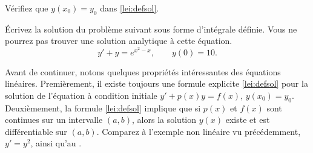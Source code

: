 \begin{exercise}
	Vérifiez que $y(x_0) = y_0$ dans \eqref{lei:defsol}.
\end{exercise}

\begin{exercise}
	Écrivez la solution du problème suivant sous forme d'intégrale définie.  Vous ne pourrez pas trouver une solution analytique à cette équation.
	\begin{equation*}
		y' + y = e^{x^2-x}, \qquad y(0) = 10 .
	\end{equation*}
\end{exercise}

\begin{remark}\label{rem:regular}
	Avant de continuer, notons quelques propriétés intéressantes des équations linéaires.  Premièrement, il existe toujours une formule explicite \eqref{lei:defsol} pour la
	solution de l'équation à condition initiale
	$y' + p(x) y = f(x)$, $y(x_0) = y_0$.  Deuxièmement, la formule
	\eqref{lei:defsol} implique que si $p(x)$
	et $f(x)$ sont continues sur un intervalle $(a , b)$, alors la solution
	$y(x)$ existe et est différentiable sur $(a , b)$.  Comparez à l'exemple non linéaire vu précédemment, $y'=y^2$,
	ainsi qu'au .
\end{remark}


